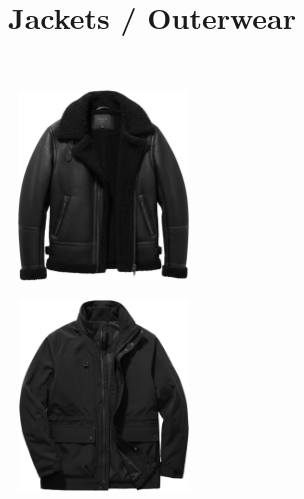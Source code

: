 \documentclass[10pt]{article}
\begin{document}
\section*{Jackets / Outerwear}\
\vspace*{2mm}\noindent
\begin{minipage}[c][50.60mm][c]{50.60mm}\centering
\includegraphics[width=50.60mm,height=50.60mm,keepaspectratio]{assets/jackets/black-montone.png}\
\end{minipage} \hspace*{6.00mm} \begin{minipage}[c][50.60mm][c]{50.60mm}\centering
\includegraphics[width=50.60mm,height=50.60mm,keepaspectratio]{assets/jackets/black-parka-waterproof.png}\
\end{minipage}\
\vspace*{6.00mm}\
\newpage
\end{document}
